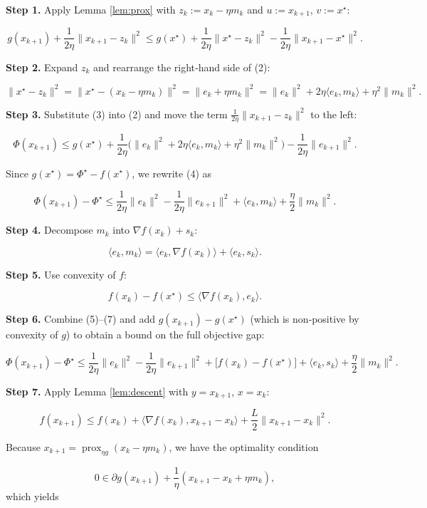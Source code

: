\documentclass{article}
\begin{document}
\bigskip
\noindent\textbf{Step 1.}  Apply Lemma \ref{lem:prox} with $z_k:=x_k-\eta m_k$ and $u:=x_{k+1}$, $v:=x^\star$:

\[
g(x_{k+1})+\frac{1}{2\eta}\|x_{k+1}-z_k\|^2
\le g(x^\star)+\frac{1}{2\eta}\|x^\star-z_k\|^2-\frac{1}{2\eta}\|x_{k+1}-x^\star\|^2 .
\tag{2}
\]

\noindent\textbf{Step 2.}  Expand $z_k$ and rearrange the right‑hand side of (2):

\[
\|x^\star-z_k\|^2
= \|x^\star-(x_k-\eta m_k)\|^2
= \|e_k+\eta m_k\|^2
= \|e_k\|^2+2\eta\langle e_k,m_k\rangle+\eta^2\|m_k\|^2 .
\tag{3}
\]

\noindent\textbf{Step 3.}  Substitute (3) into (2) and move the term $\frac{1}{2\eta}\|x_{k+1}-z_k\|^2$ to the left:

\[
\Phi(x_{k+1}) 
\le g(x^\star)+\frac{1}{2\eta}\bigl(\|e_k\|^2+2\eta\langle e_k,m_k\rangle+\eta^2\|m_k\|^2\bigr)
-\frac{1}{2\eta}\|e_{k+1}\|^2 .
\tag{4}
\]

Since $g(x^\star)=\Phi^\star-f(x^\star)$, we rewrite (4) as

\[
\Phi(x_{k+1})-\Phi^\star
\le \frac{1}{2\eta}\|e_k\|^2-\frac{1}{2\eta}\|e_{k+1}\|^2
+\langle e_k,m_k\rangle+\frac{\eta}{2}\|m_k\|^2 .
\tag{5}
\]

\noindent\textbf{Step 4.}  Decompose $m_k$ into $\nabla f(x_k)+s_k$:

\[
\langle e_k,m_k\rangle
= \langle e_k,\nabla f(x_k)\rangle+\langle e_k,s_k\rangle .
\tag{6}
\]

\noindent\textbf{Step 5.}  Use convexity of $f$:

\[
f(x_k)-f(x^\star)\le\langle\nabla f(x_k),e_k\rangle .
\tag{7}
\]

\noindent\textbf{Step 6.}  Combine (5)–(7) and add $g(x_{k+1})-g(x^\star)$ (which is non‑positive by convexity of $g$) to obtain a bound on the full objective gap:

\[
\Phi(x_{k+1})-\Phi^\star
\le \frac{1}{2\eta}\|e_k\|^2-\frac{1}{2\eta}\|e_{k+1}\|^2
+\bigl[f(x_k)-f(x^\star)\bigr]
+\langle e_k,s_k\rangle+\frac{\eta}{2}\|m_k\|^2 .
\tag{8}
\]

\noindent\textbf{Step 7.}  Apply Lemma \ref{lem:descent} with $y=x_{k+1}$, $x=x_k$:

\[
f(x_{k+1})\le f(x_k)+\langle\nabla f(x_k),x_{k+1}-x_k\rangle+\frac{L}{2}\|x_{k+1}-x_k\|^2 .
\tag{9}
\]

Because $x_{k+1}= \operatorname{prox}_{\eta g}(x_k-\eta m_k)$, we have the optimality condition  

\[
0\in \partial g(x_{k+1})+\frac{1}{\eta}(x_{k+1}-x_k+\eta m_k),
\]
which yields  
\end{document}
